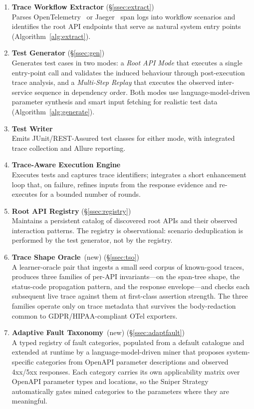\documentclass[conference]{IEEEtran}
\begin{document}
\begin{enumerate}[leftmargin=*]
  \item \textbf{Trace Workflow Extractor}
        \hfill(\S\ref{ssec:extract})\\
        Parses OpenTelemetry~\cite{opentelemetry} or Jaeger~\cite{jaeger2017} span logs into workflow scenarios and identifies the root API endpoints that serve as natural system entry points (Algorithm~\ref{alg:extract}).
  \item \textbf{Test Generator}
        \hfill(\S\ref{ssec:gen})\\
        Generates test cases in two modes: a \emph{Root API Mode} that executes a single entry-point call and validates the induced behaviour through post-execution trace analysis, and a \emph{Multi-Step Replay} that executes the observed inter-service sequence in dependency order. Both modes use language-model-driven parameter synthesis and smart input fetching for realistic test data (Algorithm~\ref{alg:generate}).
  \item \textbf{Test Writer}\\
        Emits JUnit/REST-Assured test classes for either mode, with integrated trace collection and Allure reporting.
  \item \textbf{Trace-Aware Execution Engine}\\
        Executes tests and captures trace identifiers; integrates a short enhancement loop that, on failure, refines inputs from the response evidence and re-executes for a bounded number of rounds.
  \item \textbf{Root API Registry}
        \hfill(\S\ref{ssec:registry})\\
        Maintains a persistent catalog of discovered root APIs and their observed interaction patterns. The registry is observational: scenario deduplication is performed by the test generator, not by the registry.
  \item \textbf{Trace Shape Oracle}~(new)
        \hfill(\S\ref{ssec:tso})\\
        A learner-oracle pair that ingests a small seed corpus of known-good traces, produces three families of per-API invariants---on the span-tree shape, the status-code propagation pattern, and the response envelope---and checks each subsequent live trace against them at first-class assertion strength.  The three families operate only on trace metadata that survives the body-redaction common to GDPR/HIPAA-compliant OTel exporters.
  \item \textbf{Adaptive Fault Taxonomy}~(new)
        \hfill(\S\ref{ssec:adaptfault})\\
        A typed registry of fault categories, populated from a default catalogue and extended at runtime by a language-model-driven miner that proposes system-specific categories from OpenAPI parameter descriptions and observed 4xx/5xx responses. Each category carries its own applicability matrix over OpenAPI parameter types and locations, so the Sniper Strategy automatically gates mined categories to the parameters where they are meaningful.
\end{enumerate}
\end{document}
